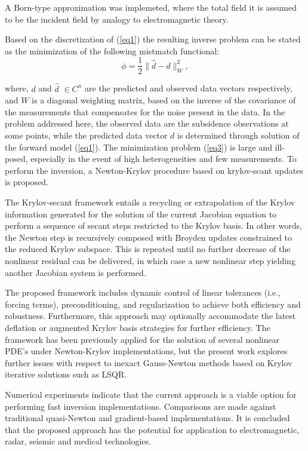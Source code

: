 \documentclass{report}
\begin{document}
A Born-type approximation was implemeted, where the total field it is
assumed to be the incident field by analogy to electromagnetic
theory.

Based on the discretization of (\ref{eq1}) the resulting inverse
problem can be stated as the minimization of the following
mistmatch functional:
\begin{equation}
\phi =\frac{1}{2} \|\hat{d}-d\|_W^2, \label{eq3}
\end{equation}

where, $d$ and $\hat{d}$ $\in C^n$ are the predicted and observed
data vectors respectively, and $W$ is a diagonal weighting matrix,
based on the inverse of the covariance of the measurements that
compensates for the noise present in the data. In the problem
addressed here, the observed data are the subsidence observations
at some points, while the predicted data vector $d$ is determined
through solution of the forward model (\ref{eq1}). The
minimization problem (\ref{eq3}) is large and ill-posed,
especially in the event of high heterogeneities and few
measurements. To perform the inversion, a Newton-Krylov procedure
based on krylov-scant updates is proposed.

The Krylov-secant framework entails a recycling or extrapolation
of the Krylov information generated for the solution of the
current Jacobian equation to perform a sequence of secant steps
restricted to the Krylov basis. In other words, the Newton step is
recursively composed with Broyden updates constrained to the
reduced Krylov subspace. This is repeated until no further
decrease of the nonlinear residual can be delivered, in which case
a new nonlinear step yielding another Jacobian system is
performed.

The proposed framework includes dynamic control of linear
tolerances (i.e., forcing terms), preconditioning, and
regularization to achieve both efficiency and robustness.
Furthermore, this approach may optionally accommodate the latest
deflation or augmented Krylov basis strategies for further
efficiency. The framework has been previously applied for the
solution of several nonlinear PDE's under Newton-Krylov
implementations, but the present work explores further issues with
respect to inexact Gauss-Newton methods based on Krylov iterative
solutions such as LSQR.

Numerical experiments indicate that the current approach is a
viable option for performing fast inversion implementations.
Comparisons are made against traditional quasi-Newton and
gradient-based implementations. It is concluded that the proposed
approach has the potential for application to electromagnetic,
radar, seismic and medical technologies.
\end{document}
